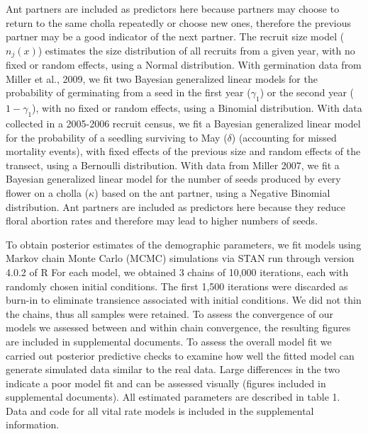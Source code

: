 \documentclass[12pt,a4paper]{article}
\begin{document}
Ant partners are included as predictors here because partners may choose to return to the same cholla repeatedly or choose new ones, therefore the previous partner may be a good indicator of the next partner. 
The recruit size model ($n_j(x)$) estimates the size distribution of all recruits from a given year, with no fixed or random effects, using a Normal distribution. 
With germination data from Miller et al., 2009, we fit two Bayesian generalized linear models for the probability of germinating from a seed in the first year ($\gamma_1$) or the second year ($1 - \gamma_1$), with no fixed or random effects, using a Binomial distribution.
With data collected in a 2005-2006 recruit census, we fit a Bayesian generalized linear model for the probability of a seedling surviving to May ($\delta$) (accounting for missed mortality events), with fixed effects of the previous size and random effects of the transect, using a Bernoulli distribution. 
With data from Miller 2007, we fit a Bayesian generalized linear model for the number of seeds produced by every flower on a cholla ($\kappa$) based on the ant partner, using a Negative Binomial distribution. 
Ant partners are included as predictors here because they reduce floral abortion rates and therefore may lead to higher numbers of seeds. 

To obtain posterior estimates of the demographic parameters, we fit models using Markov chain Monte Carlo (MCMC) simulations via STAN run through version 4.0.2 of R 
For each model, we obtained 3 chains of 10,000 iterations, each with randomly chosen initial conditions. 
The first 1,500 iterations were discarded as burn-in to eliminate transience associated with initial conditions. 
We did not thin the chains, thus all samples were retained. 
To assess the convergence of our models we assessed between and within chain convergence, the resulting figures are included in supplemental documents. 
To assess the overall model fit we carried out posterior predictive checks to examine how well the fitted model can generate simulated data similar to the real data.
Large differences in the two indicate a poor model fit and can be assessed visually (figures included in supplemental documents). 
All estimated parameters are described in table 1.
Data and code for all vital rate models is included in the supplemental information.
\end{document}
